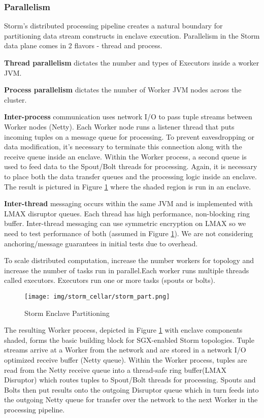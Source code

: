 \subsubsection{Parallelism}

Storm’s distributed processing pipeline creates a natural boundary for partitioning data stream constructs in enclave execution. Parallelism in the Storm data plane comes in 2 flavors - thread and process. 

\textbf{Thread parallelism }dictates the number and types of Executors inside a worker JVM.

\textbf{Process parallelism} dictates the number of Worker JVM nodes across the cluster.

\textbf{Inter-process} communication uses network I/O to pass tuple streams between Worker nodes (Netty). Each Worker node runs a listener thread that puts incoming tuples on a message queue for processing. To prevent eavesdropping or data modification, it’s necessary to terminate this connection along with the receive queue inside an enclave. Within the Worker process, a second queue is used to feed data to the Spout/Bolt threads for processing. Again, it is necessary to place both the data transfer queues and the processing logic inside an enclave. The result is pictured in Figure \ref{fig:storm_part} where the shaded region is run in an enclave. 

 \textbf{Inter-thread} messaging occurs within the same JVM and is implemented with LMAX disruptor queues. Each thread has high performance, non-blocking ring buffer. Inter-thread messaging can use symmetric encryption on LMAX so we need to test performance of both (assumed in Figure \ref{fig:storm_part}). We are not considering anchoring/message guarantees in initial tests due to overhead.
 
To scale distributed computation, increase the number workers for topology and increase the number of tasks run in parallel.Each worker runs multiple threads called executors. Executors run one or more tasks (spouts or bolts).

\begin{figure}[H]
\centering
\texttt{[image: img/storm\_cellar/storm\_part.png]}
\caption{Storm Enclave Partitioning}
\label{fig:storm_part}
\end{figure}

The resulting Worker process, depicted in Figure \ref{fig:storm_part} with enclave components shaded, forms the basic building block for SGX-enabled Storm topologies. Tuple streams arrive at a Worker from the network and are stored in a network I/O optimized receive buffer (Netty queue).  Within the Worker process, tuples are read from the Netty receive queue into a thread-safe ring buffer(LMAX Disruptor) which routes tuples to Spout/Bolt threads for processing. Spouts and Bolts then put results onto the outgoing Disruptor queue which in turn feeds into the outgoing Netty queue for transfer over the network to the next Worker in the processing pipeline. 

